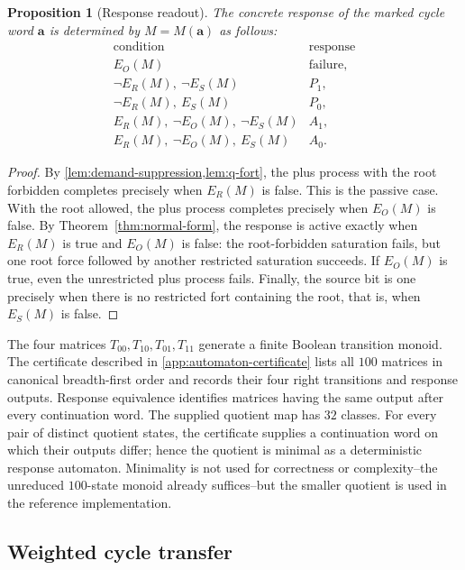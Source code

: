 \documentclass[11pt,reqno]{amsart}
\newtheorem{proposition}[proposition]{Proposition}
\theoremstyle{definition}
\begin{document}
\begin{proposition}[Response readout]\label{prop:cycle-readout}
The concrete response of the marked cycle word $\mathbf a$ is determined by
$M=M(\mathbf a)$ as follows:
\[
\begin{array}{c|c}
\text{condition}&\text{response}\\
\hline
E_O(M)&\text{failure},\\
\neg E_R(M),\ \neg E_S(M)&P_1,\\
\neg E_R(M),\ E_S(M)&P_0,\\
E_R(M),\ \neg E_O(M),\ \neg E_S(M)&A_1,\\
E_R(M),\ \neg E_O(M),\ E_S(M)&A_0.
\end{array}
\]
\end{proposition}

\begin{proof}
By \cref{lem:demand-suppression,lem:q-fort}, the plus process with the root
forbidden completes precisely when $E_R(M)$ is false.  This is the passive
case.  With the root allowed, the plus process completes precisely when
$E_O(M)$ is false.  By Theorem~\ref{thm:normal-form}, the response is active exactly when $E_R(M)$ is true and $E_O(M)$ is false: the root-forbidden saturation fails, but one root force followed by another restricted saturation succeeds.  If $E_O(M)$ is true, even the unrestricted plus process
fails.  Finally, the source bit is one precisely when there is no restricted
fort containing the root, that is, when $E_S(M)$ is false.
\end{proof}

The four matrices $T_{00},T_{10},T_{01},T_{11}$ generate a finite Boolean
transition monoid.  The certificate described in
\cref{app:automaton-certificate} lists all $100$ matrices in canonical
breadth-first order and records their four right transitions and response
outputs.  Response equivalence identifies matrices having the same output
after every continuation word.  The supplied quotient map has $32$ classes.
For every pair of distinct quotient states, the certificate supplies a
continuation word on which their outputs differ; hence the quotient is minimal
as a deterministic response automaton.  Minimality is not used for correctness
or complexity--the unreduced $100$-state monoid already suffices--but the
smaller quotient is used in the reference implementation.

\subsection{Weighted cycle transfer}
\end{document}
